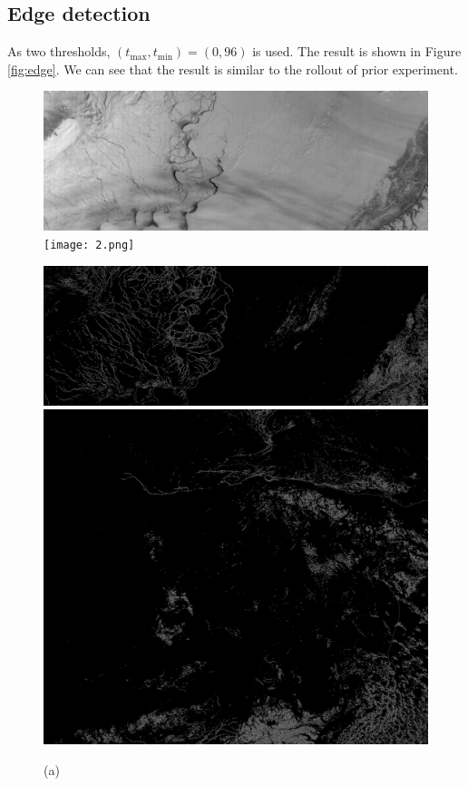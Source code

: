 \documentclass{article}
\begin{document}
    \subsection{Edge detection} \label{sec:edge}
        As two thresholds, $(t_\mathrm{max}, t_\mathrm{min}) = (0, 96)$ is used.
        The result is shown in Figure \ref{fig:edge}.
        We can see that the result is similar to the rollout of prior experiment.

        \begin{figure}[h]
            \centering
            \begin{minipage}{0.49\hsize}
                \centering
                \includegraphics[width = 1\hsize]{1.png}
                \texttt{[image: 2.png]}
                \caption*{(a)}
            \end{minipage}
            \begin{minipage}{0.49\hsize}
                \centering
                \includegraphics[width = 1\hsize]{1_edge.png}
                \includegraphics[width = 1\hsize]{2_edge.png}

\end{minipage}
\end{figure}
\end{document}
